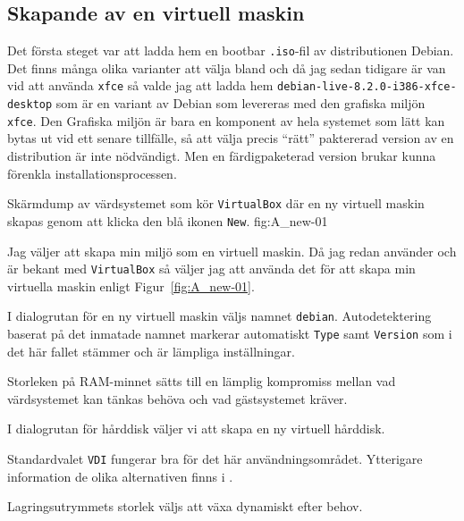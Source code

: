 \subsection{Skapande av en virtuell maskin}
Det första steget var att ladda hem en bootbar \texttt{.iso}-fil av
distributionen Debian. Det finns många olika varianter att välja bland och då
jag sedan tidigare är van vid att använda \texttt{xfce} så valde jag att ladda
hem \texttt{debian-live-8.2.0-i386-xfce-desktop} som är en variant av Debian
som levereras med den grafiska miljön \texttt{xfce}. Den Grafiska miljön är
bara en komponent av hela systemet som lätt kan bytas ut vid ett senare
tillfälle, så att välja precis ``rätt'' paktererad version av en distribution
är inte nödvändigt.  Men en färdigpaketerad version brukar kunna förenkla
installationsprocessen.

           {Skärmdump av värdsystemet som kör \texttt{VirtualBox} där en ny
            virtuell maskin skapas genom att klicka den blå ikonen
            \texttt{New}.}
           {fig:A_new-01}

Jag väljer att skapa min miljö som en virtuell maskin. Då jag redan använder
och är bekant med \texttt{VirtualBox} så väljer jag att använda det för att
skapa min virtuella maskin enligt Figur~\ref{fig:A_new-01}.

           {I dialogrutan för en ny virtuell maskin väljs namnet
            \texttt{debian}. Autodetektering baserat på det inmatade
            namnet markerar automatiskt \texttt{Type} samt \texttt{Version}
            som i det här fallet stämmer och är lämpliga inställningar.}
           {}

           {Storleken på RAM-minnet sätts till en lämplig kompromiss mellan
            vad värdsystemet kan tänkas behöva och vad gästsystemet kräver.}
           {}

           {I dialogrutan för hårddisk väljer vi att skapa en ny virtuell
            hårddisk.}
           {}

           {Standardvalet \texttt{VDI} fungerar bra för det här
            användningsområdet. Ytterigare information de olika alternativen
            finns i \cite{virtualbox:vdidetails}.}
           {}

           {Lagringsutrymmets storlek väljs att växa dynamiskt efter behov.}
           {}

